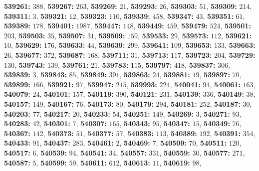 \textsf{\bfseries 539261:} $388$, \textsf{\bfseries 539267:} $263$, \textsf{\bfseries 539269:} $21$, \textsf{\bfseries 539293:} $26$, \textsf{\bfseries 539303:} $51$, \textsf{\bfseries 539309:} $214$, \textsf{\bfseries 539311:} $3$, \textsf{\bfseries 539321:} $12$, \textsf{\bfseries 539323:} $110$, \textsf{\bfseries 539339:} $458$, \textsf{\bfseries 539347:} $43$, \textsf{\bfseries 539351:} $61$, \textsf{\bfseries 539389:} $178$, \textsf{\bfseries 539401:} $1987$, \textsf{\bfseries 539447:} $148$, \textsf{\bfseries 539449:} $459$, \textsf{\bfseries 539479:} $524$, \textsf{\bfseries 539501:} $203$, \textsf{\bfseries 539503:} $35$, \textsf{\bfseries 539507:} $31$, \textsf{\bfseries 539509:} $159$, \textsf{\bfseries 539533:} $29$, \textsf{\bfseries 539573:} $112$, \textsf{\bfseries 539621:} $10$, \textsf{\bfseries 539629:} $176$, \textsf{\bfseries 539633:} $44$, \textsf{\bfseries 539639:} $299$, \textsf{\bfseries 539641:} $109$, \textsf{\bfseries 539653:} $133$, \textsf{\bfseries 539663:} $26$, \textsf{\bfseries 539677:} $372$, \textsf{\bfseries 539687:} $168$, \textsf{\bfseries 539711:} $31$, \textsf{\bfseries 539713:} $117$, \textsf{\bfseries 539723:} $204$, \textsf{\bfseries 539729:} $130$, \textsf{\bfseries 539743:} $139$, \textsf{\bfseries 539761:} $21$, \textsf{\bfseries 539783:} $115$, \textsf{\bfseries 539797:} $418$, \textsf{\bfseries 539837:} $306$, \textsf{\bfseries 539839:} $3$, \textsf{\bfseries 539843:} $85$, \textsf{\bfseries 539849:} $391$, \textsf{\bfseries 539863:} $24$, \textsf{\bfseries 539881:} $19$, \textsf{\bfseries 539897:} $70$, \textsf{\bfseries 539899:} $166$, \textsf{\bfseries 539921:} $97$, \textsf{\bfseries 539947:} $215$, \textsf{\bfseries 539993:} $224$, \textsf{\bfseries 540041:} $94$, \textsf{\bfseries 540061:} $163$, \textsf{\bfseries 540079:} $24$, \textsf{\bfseries 540101:} $157$, \textsf{\bfseries 540119:} $390$, \textsf{\bfseries 540121:} $231$, \textsf{\bfseries 540139:} $336$, \textsf{\bfseries 540149:} $38$, \textsf{\bfseries 540157:} $149$, \textsf{\bfseries 540167:} $76$, \textsf{\bfseries 540173:} $80$, \textsf{\bfseries 540179:} $294$, \textsf{\bfseries 540181:} $252$, \textsf{\bfseries 540187:} $30$, \textsf{\bfseries 540203:} $77$, \textsf{\bfseries 540217:} $20$, \textsf{\bfseries 540233:} $54$, \textsf{\bfseries 540251:} $149$, \textsf{\bfseries 540269:} $3$, \textsf{\bfseries 540271:} $93$, \textsf{\bfseries 540283:} $42$, \textsf{\bfseries 540301:} $7$, \textsf{\bfseries 540307:} $165$, \textsf{\bfseries 540343:} $95$, \textsf{\bfseries 540347:} $15$, \textsf{\bfseries 540349:} $76$, \textsf{\bfseries 540367:} $142$, \textsf{\bfseries 540373:} $51$, \textsf{\bfseries 540377:} $57$, \textsf{\bfseries 540383:} $113$, \textsf{\bfseries 540389:} $192$, \textsf{\bfseries 540391:} $354$, \textsf{\bfseries 540433:} $91$, \textsf{\bfseries 540437:} $283$, \textsf{\bfseries 540461:} $2$, \textsf{\bfseries 540469:} $7$, \textsf{\bfseries 540509:} $70$, \textsf{\bfseries 540511:} $120$, \textsf{\bfseries 540517:} $6$, \textsf{\bfseries 540539:} $94$, \textsf{\bfseries 540541:} $34$, \textsf{\bfseries 540557:} $331$, \textsf{\bfseries 540559:} $30$, \textsf{\bfseries 540577:} $271$, \textsf{\bfseries 540587:} $5$, \textsf{\bfseries 540599:} $59$, \textsf{\bfseries 540611:} $612$, \textsf{\bfseries 540613:} $11$, \textsf{\bfseries 540619:} $98$, 
